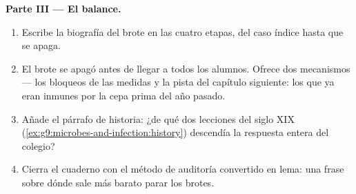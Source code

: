 \begin{problem}
\medskip\noindent\textbf{Parte III --- El balance.}
\begin{enumerate}[resume]
  \item Escribe la biografía del brote en las cuatro etapas, del caso
        índice hasta que se apaga.
  \item El brote se apagó antes de llegar a todos los alumnos. Ofrece
        dos mecanismos --- los bloqueos de las medidas y la pista del
        capítulo siguiente: los que ya eran inmunes por la cepa prima
        del año pasado.
  \item Añade el párrafo de historia: ¿de qué dos lecciones del siglo
        XIX (\cref{ex:g9:microbes-and-infection:history}) descendía la
        respuesta entera del colegio?
  \item Cierra el cuaderno con el método de auditoría convertido en
        lema: una frase sobre dónde sale más barato parar los brotes.
\end{enumerate}
\end{problem}
